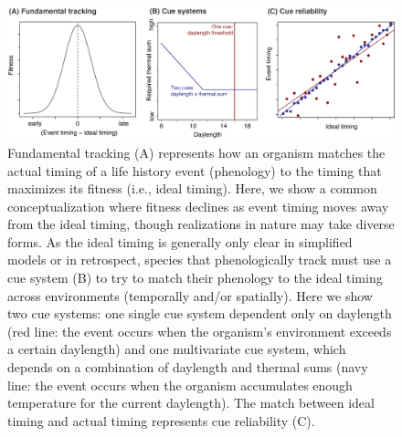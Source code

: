 \documentclass[11pt,letterpaper]{article}
\begin{document}
\begin{figure}[h!]
\centering
\includegraphics[width=1\textwidth]{..//..//..//..//R/graphs/conceptual/envtracking_define2.png}
\caption{Fundamental tracking (A) represents how an organism matches the actual timing of a life history event (phenology) to the timing that maximizes its fitness (i.e., ideal timing). Here, we show a common conceptualization where fitness declines as event timing moves away from the ideal timing, though realizations in nature may take diverse forms. As the ideal timing is generally only clear in simplified models or in retrospect, species that phenologically track must use a cue system (B) to try to match their phenology to the ideal timing across environments (temporally and/or spatially). Here we show two cue systems: one single cue system dependent only on daylength (red line: the event occurs when the organism's environment exceeds a certain daylength) and one multivariate cue system, which depends on a combination of daylength and thermal sums (navy line: the event occurs when the organism accumulates enough temperature for the current daylength). The match between ideal timing and actual timing represents cue reliability (C). } 
 \label{fig:defineETorig}
\end{figure}
\end{document}
